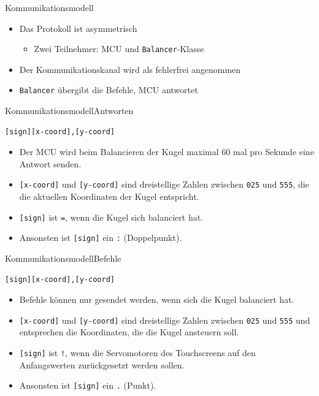 \documentclass{beamer}
\begin{document}
\begin{frame}[fragile,t]{Kommunikationsmodell}
\begin{itemize}
\item Das Protokoll ist asymmetrisch
\begin{itemize}
\item Zwei Teilnehmer: MCU und \verb~Balancer~-Klasse
\end{itemize}
\item Der Kommunikationskanal wird als fehlerfrei angenommen
\item \verb~Balancer~ übergibt die Befehle, MCU antwortet
\end{itemize}
\end{frame}

\begin{frame}[fragile,t]{Kommunikationsmodell}{Antworten}
\begin{verbatim}
[sign][x-coord],[y-coord]
\end{verbatim}

\begin{itemize}
\item Der MCU wird beim Balancieren der Kugel maximal 60 mal pro Sekunde eine Antwort senden.
\item \texttt{[x-coord]} und \texttt{[y-coord]} sind dreistellige Zahlen zwischen \texttt{025} und \texttt{555}, die die aktuellen Koordinaten der Kugel entspricht.
\item \texttt{[sign]} ist \texttt{=}, wenn die Kugel sich balanciert hat.
\item Ansonsten ist \texttt{[sign]} ein \texttt{:} (Doppelpunkt).
\end{itemize}
\end{frame}

\begin{frame}[fragile,t]{Kommunikationsmodell}{Befehle}
\begin{verbatim}
[sign][x-coord],[y-coord]
\end{verbatim}

\begin{itemize}
\item Befehle können nur gesendet werden, wenn sich die Kugel balanciert hat.
\item \texttt{[x-coord]} und \texttt{[y-coord]} sind dreistellige Zahlen zwischen \texttt{025} und \texttt{555} und entsprechen die Koordinaten, die die Kugel ansteuern soll.
\item \texttt{[sign]} ist \texttt{!}, wenn die Servomotoren des Touchscreens auf den Anfangswerten zurückgesetzt werden sollen.
\item Ansonsten ist \texttt{[sign]} ein \texttt{.} (Punkt).
\end{itemize}
\end{frame}
\end{document}

